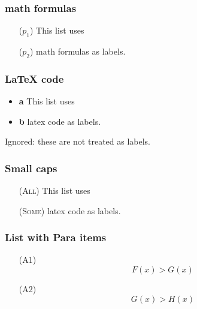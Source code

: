 \documentclass[
]{article}
\providecommand{\tightlist}{%
  \setlength{\itemsep}{0pt}\setlength{\parskip}{0pt}}
\begin{document}
\hypertarget{math-formulas}{%
\subsubsection{math formulas}\label{math-formulas}}

\begin{itemize}
\tightlist

\item[(\(p_1\))] This list uses

\item[(\(p_2\))] math formulas as labels.

\end{itemize}

\hypertarget{latex-code}{%
\subsubsection{LaTeX code}\label{latex-code}}

\begin{itemize}
\tightlist
\item
  {\textbf{a}} This list uses
\item
  {\textbf{b}} latex code as labels.
\end{itemize}

Ignored: these are not treated as labels.

\hypertarget{small-caps}{%
\subsubsection{Small caps}\label{small-caps}}

\begin{itemize}
\tightlist

\item[(\textsc{All})] This list uses

\item[(\textsc{Some})] latex code as labels.

\end{itemize}

\hypertarget{list-with-para-items}{%
\subsubsection{List with Para items}\label{list-with-para-items}}

\begin{itemize}
\tightlist

\item[(A1)] \[F(x) > G(x)\]

\item[(A2)] \[G(x) > H(x)\]

\end{itemize}
\end{document}
